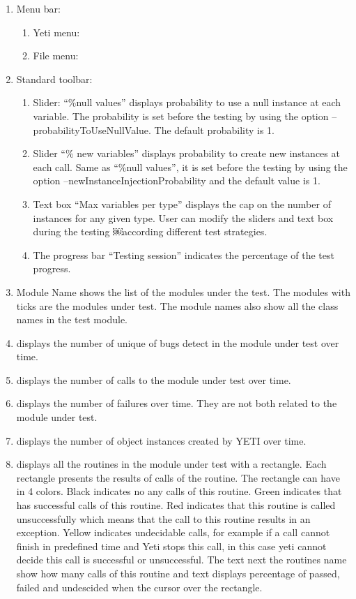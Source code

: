 \begin{enumerate}

\item Menu bar:
\begin{enumerate}
\item Yeti menu:
\item File menu:
\end{enumerate}
\item Standard toolbar:
\begin{enumerate}
\item Slider: “\%null values” displays probability to use a null instance at each variable. The probability is set before the testing by using the option –probabilityToUseNullValue. The default probability is 1. 
\item Slider “\% new variables” displays probability to create new instances at each call. Same as “\%null values”, it is set before the testing by using the option –newInstanceInjectionProbability and the default value is 1. 
\item Text box “Max variables per type” displays the cap on the number of instances for any given type. User can modify the sliders and text box during the testing ￼according different test strategies. 
\item The progress bar “Testing session” indicates the percentage of the test progress.
\end{enumerate}
\item Module Name shows the list of the modules under the test. The
modules with ticks are the modules under test. The module names also show all the
class names in the test module.
\item displays the number of unique of bugs detect in the module under
test over time.
\item displays the number of calls to the module under test over time.
\item displays the number of failures over time. They are not both related
to the module under test.
\item displays the number of object instances created by YETI over time.
\item displays all the routines in the module under test with a rectangle.
Each rectangle presents the results of calls of the routine. The rectangle can have in 4 colors. Black indicates no any calls of this routine. Green indicates that has successful calls of this routine. Red indicates that this routine is called unsuccessfully which means that the call to this routine results in an exception. Yellow indicates undecidable calls, for example if a call cannot finish in predefined time and Yeti stops this call, in this case yeti cannot decide this call is successful or unsuccessful. The text next the routines name show how many calls of this routine and text displays percentage of passed, failed and undescided when the cursor over the rectangle.

\end{enumerate}
